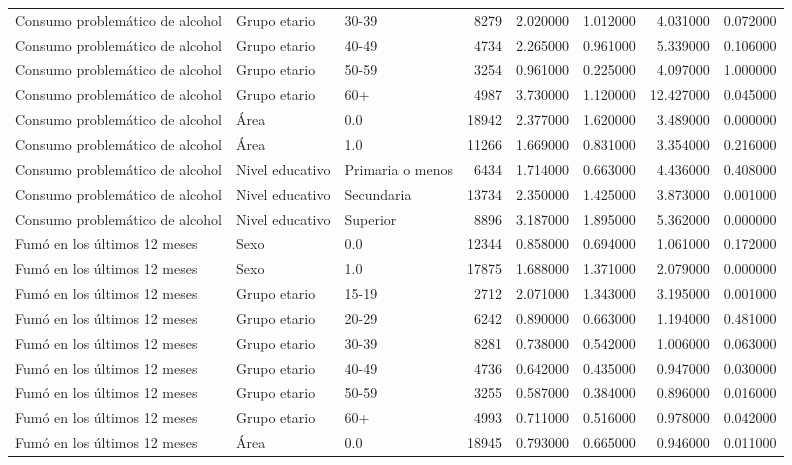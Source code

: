 \begin{longtable}{lllrrrrr}
Consumo problemático de alcohol & Grupo etario & 30-39 & 8279 & 2.020000 & 1.012000 & 4.031000 & 0.072000 \\
Consumo problemático de alcohol & Grupo etario & 40-49 & 4734 & 2.265000 & 0.961000 & 5.339000 & 0.106000 \\
Consumo problemático de alcohol & Grupo etario & 50-59 & 3254 & 0.961000 & 0.225000 & 4.097000 & 1.000000 \\
Consumo problemático de alcohol & Grupo etario & 60+ & 4987 & 3.730000 & 1.120000 & 12.427000 & 0.045000 \\
Consumo problemático de alcohol & Área & 0.0 & 18942 & 2.377000 & 1.620000 & 3.489000 & 0.000000 \\
Consumo problemático de alcohol & Área & 1.0 & 11266 & 1.669000 & 0.831000 & 3.354000 & 0.216000 \\
Consumo problemático de alcohol & Nivel educativo & Primaria o menos & 6434 & 1.714000 & 0.663000 & 4.436000 & 0.408000 \\
Consumo problemático de alcohol & Nivel educativo & Secundaria & 13734 & 2.350000 & 1.425000 & 3.873000 & 0.001000 \\
Consumo problemático de alcohol & Nivel educativo & Superior & 8896 & 3.187000 & 1.895000 & 5.362000 & 0.000000 \\
Fumó en los últimos 12 meses & Sexo & 0.0 & 12344 & 0.858000 & 0.694000 & 1.061000 & 0.172000 \\
Fumó en los últimos 12 meses & Sexo & 1.0 & 17875 & 1.688000 & 1.371000 & 2.079000 & 0.000000 \\
Fumó en los últimos 12 meses & Grupo etario & 15-19 & 2712 & 2.071000 & 1.343000 & 3.195000 & 0.001000 \\
Fumó en los últimos 12 meses & Grupo etario & 20-29 & 6242 & 0.890000 & 0.663000 & 1.194000 & 0.481000 \\
Fumó en los últimos 12 meses & Grupo etario & 30-39 & 8281 & 0.738000 & 0.542000 & 1.006000 & 0.063000 \\
Fumó en los últimos 12 meses & Grupo etario & 40-49 & 4736 & 0.642000 & 0.435000 & 0.947000 & 0.030000 \\
Fumó en los últimos 12 meses & Grupo etario & 50-59 & 3255 & 0.587000 & 0.384000 & 0.896000 & 0.016000 \\
Fumó en los últimos 12 meses & Grupo etario & 60+ & 4993 & 0.711000 & 0.516000 & 0.978000 & 0.042000 \\
Fumó en los últimos 12 meses & Área & 0.0 & 18945 & 0.793000 & 0.665000 & 0.946000 & 0.011000 \\

\end{longtable}
